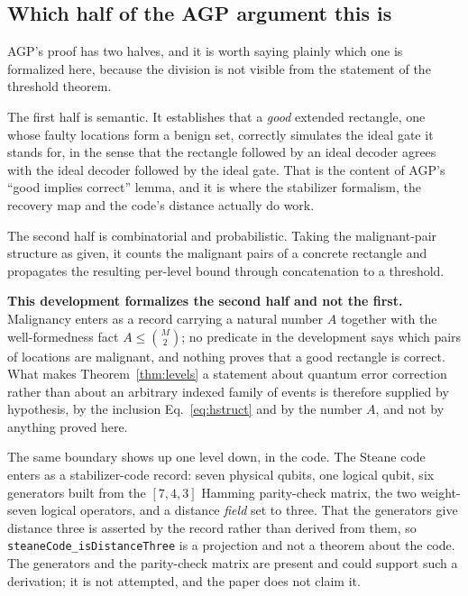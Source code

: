 \documentclass[aps,prx,reprint,nofootinbib,superscriptaddress]{revtex4-2}
\begin{document}

\subsection{Which half of the AGP argument this is}
\label{sec:steane:half}

AGP's proof has two halves, and it is worth saying plainly which one is
formalized here, because the division is not visible from the statement of the
threshold theorem.

The first half is semantic. It establishes that a \emph{good} extended
rectangle, one whose faulty locations form a benign set, correctly
simulates the ideal gate it stands for, in the sense that the rectangle followed
by an ideal decoder agrees with the ideal decoder followed by the ideal gate.
That is the content of AGP's ``good implies correct'' lemma, and it is where the
stabilizer formalism, the recovery map and the code's distance actually do work.

The second half is combinatorial and probabilistic. Taking the malignant-pair
structure as given, it counts the malignant pairs of a concrete rectangle and
propagates the resulting per-level bound through concatenation to a threshold.

\textbf{This development formalizes the second half and not the first.}
Malignancy enters as a record carrying a natural number $A$ together with the
well-formedness fact $A \le \binom{M}{2}$; no predicate in the development says
which pairs of locations are malignant, and nothing proves that a good rectangle
is correct. What makes Theorem~\ref{thm:levels} a statement about quantum error
correction rather than about an arbitrary indexed family of events is therefore
supplied by hypothesis, by the inclusion Eq.~\eqref{eq:hstruct} and by the
number $A$, and not by anything proved here.

The same boundary shows up one level down, in the code. The Steane code enters
as a stabilizer-code record: seven physical qubits, one logical qubit, six
generators built from the $[7,4,3]$ Hamming parity-check matrix, the two
weight-seven logical operators, and a distance \emph{field} set to three. That
the generators give distance three is asserted by the record rather than derived
from them, so \verb|steaneCode_isDistanceThree| is a projection and not a
theorem about the code. The generators and the parity-check matrix are present
and could support such a derivation; it is not attempted, and the paper does not
claim it.
\end{document}
